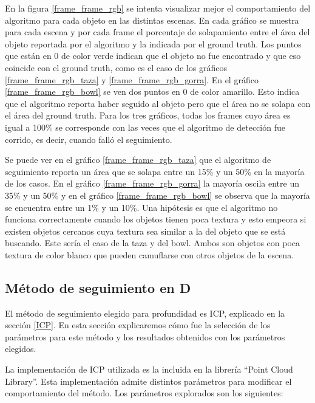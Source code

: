 En la figura \ref{frame_frame_rgb} se intenta visualizar mejor el comportamiento del algoritmo para cada objeto en las distintas escenas. En cada gráfico se muestra para cada escena y por cada frame el porcentaje de solapamiento entre el área del objeto reportada por el algoritmo y la indicada por el ground truth. Los puntos que están en 0 de color verde indican que el objeto no fue encontrado y que eso coincide con el ground truth, como es el caso de los gráficos \ref{frame_frame_rgb_taza} y \ref{frame_frame_rgb_gorra}. En el gráfico \ref{frame_frame_rgb_bowl} se ven dos puntos en 0 de color amarillo. Esto indica que el algoritmo reporta haber seguido al objeto pero que el área no se solapa con el área del ground truth. Para los tres gráficos, todas los frames cuyo área es igual a 100\% se corresponde con las veces que el algoritmo de detección fue corrido, es decir, cuando falló el seguimiento. 

Se puede ver en el gráfico \ref{frame_frame_rgb_taza} que el algoritmo de seguimiento reporta un área que se solapa entre un 15\% y un 50\% en la mayoría de los casos. En el gráfico \ref{frame_frame_rgb_gorra} la mayoría oscila entre un 35\% y un 50\% y en el gráfico \ref{frame_frame_rgb_bowl} se observa que la mayoría se encuentra entre un 1\% y un 10\%. Una hipótesis es que el algoritmo no funciona correctamente cuando los objetos tienen poca textura y esto empeora si existen objetos cercanos cuya textura sea similar a la del objeto que se está buscando. Este sería el caso de la taza y del bowl. Ambos son objetos con poca textura de color blanco que pueden camuflarse con otros objetos de la escena. 



\subsection{Método de seguimiento en D}
El método de seguimiento elegido para profundidad es ICP, explicado en la sección \ref{ICP}. En esta sección explicaremos cómo fue la selección de los parámetros para este método y los resultados obtenidos con los parámetros elegidos.

La implementación de ICP utilizada es la incluida en la librería ``Point Cloud Library''. Esta implementación admite distintos parámetros para modificar el comportamiento del método. Los parámetros explorados son los siguientes:

